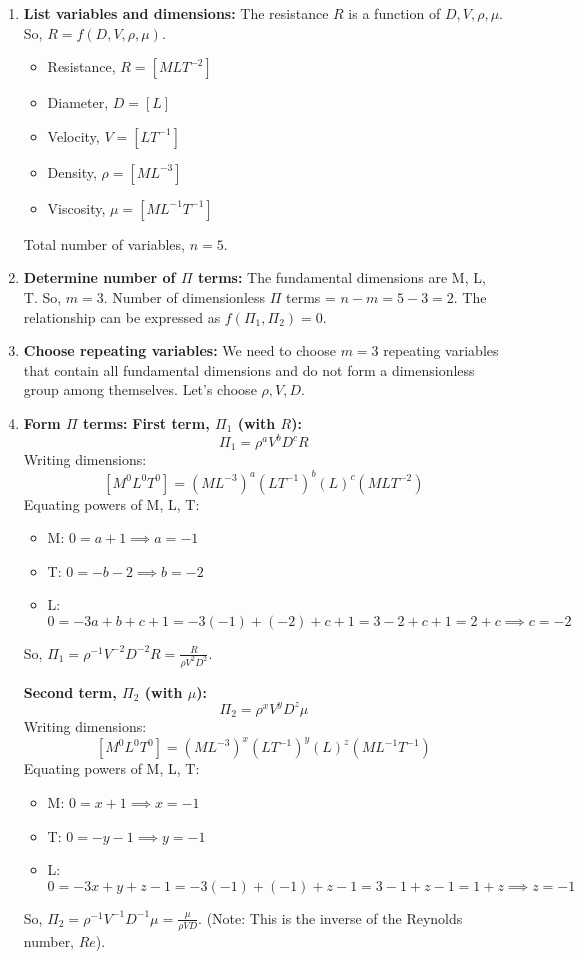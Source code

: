 \documentclass{article}
\begin{document}
\begin{enumerate}
    \item \textbf{List variables and dimensions:}
    The resistance $R$ is a function of $D, V, \rho, \mu$. So, $R = f(D, V, \rho, \mu)$.
    \begin{itemize}
        \item Resistance, $R = [MLT^{-2}]$
        \item Diameter, $D = [L]$
        \item Velocity, $V = [LT^{-1}]$
        \item Density, $\rho = [ML^{-3}]$
        \item Viscosity, $\mu = [ML^{-1}T^{-1}]$
    \end{itemize}
    Total number of variables, $n=5$.
    
    \item \textbf{Determine number of $\Pi$ terms:}
    The fundamental dimensions are M, L, T. So, $m=3$.
    Number of dimensionless $\Pi$ terms = $n-m = 5-3 = 2$.
    The relationship can be expressed as $f(\Pi_1, \Pi_2) = 0$.

    \item \textbf{Choose repeating variables:}
    We need to choose $m=3$ repeating variables that contain all fundamental dimensions and do not form a dimensionless group among themselves. Let's choose $\rho, V, D$.

    \item \textbf{Form $\Pi$ terms:}
    \textbf{First term, $\Pi_1$ (with $R$):}
    $$ \Pi_1 = \rho^a V^b D^c R $$
    Writing dimensions:
    $$ [M^0L^0T^0] = (ML^{-3})^a (LT^{-1})^b (L)^c (MLT^{-2}) $$
    Equating powers of M, L, T:
    \begin{itemize}
        \item M: $0 = a + 1 \implies a = -1$
        \item T: $0 = -b - 2 \implies b = -2$
        \item L: $0 = -3a + b + c + 1 = -3(-1) + (-2) + c + 1 = 3 - 2 + c + 1 = 2+c \implies c = -2$
    \end{itemize}
    So, $\Pi_1 = \rho^{-1} V^{-2} D^{-2} R = \frac{R}{\rho V^2 D^2}$.
    
    \textbf{Second term, $\Pi_2$ (with $\mu$):}
    $$ \Pi_2 = \rho^x V^y D^z \mu $$
    Writing dimensions:
    $$ [M^0L^0T^0] = (ML^{-3})^x (LT^{-1})^y (L)^z (ML^{-1}T^{-1}) $$
    Equating powers of M, L, T:
    \begin{itemize}
        \item M: $0 = x + 1 \implies x = -1$
        \item T: $0 = -y - 1 \implies y = -1$
        \item L: $0 = -3x + y + z - 1 = -3(-1) + (-1) + z - 1 = 3 - 1 + z - 1 = 1+z \implies z = -1$
    \end{itemize}
    So, $\Pi_2 = \rho^{-1} V^{-1} D^{-1} \mu = \frac{\mu}{\rho VD}$. (Note: This is the inverse of the Reynolds number, $Re$).


\end{enumerate}
\end{document}
